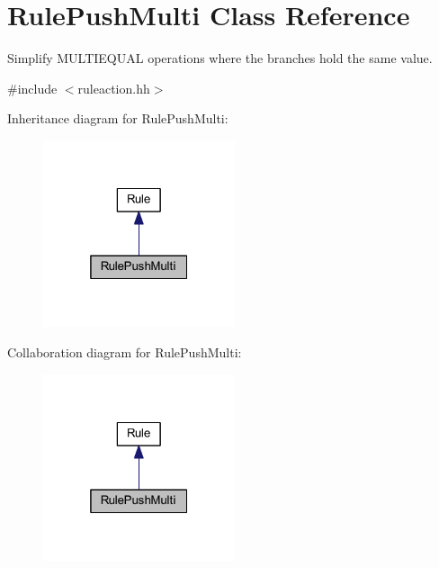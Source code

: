 \hypertarget{class_rule_push_multi}{}\section{Rule\+Push\+Multi Class Reference}
\label{class_rule_push_multi}


Simplify M\+U\+L\+T\+I\+E\+Q\+U\+AL operations where the branches hold the same value.  




{\ttfamily \#include $<$ruleaction.\+hh$>$}



Inheritance diagram for Rule\+Push\+Multi\+:
\nopagebreak
\begin{figure}[H]
\begin{center}
\leavevmode
\includegraphics[width=160pt]{class_rule_push_multi__inherit__graph}
\end{center}
\end{figure}


Collaboration diagram for Rule\+Push\+Multi\+:
\nopagebreak
\begin{figure}[H]
\begin{center}
\leavevmode
\includegraphics[width=160pt]{class_rule_push_multi__coll__graph}
\end{center}
\end{figure}
